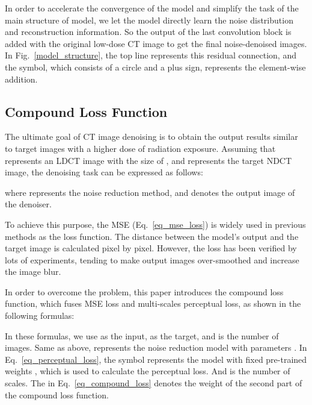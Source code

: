 \documentclass[conference]{IEEEtran}
\begin{document}
            In order to accelerate the convergence of the model and simplify the task of the main structure of model, we let the model directly learn the noise distribution and reconstruction information. 
            So the output of the last convolution block is added with the original low-dose CT image to get the final noise-denoised images.
            In Fig.~\ref{model_structure}, the top line represents this residual connection, and the symbol, which consists of a circle and a plus sign, represents the element-wise addition.

            \subsection{Compound Loss Function} \label{compound_loss_function}
                The ultimate goal of CT image denoising is to obtain the output results similar to target images with a higher dose of radiation exposure.
                Assuming that  represents an LDCT image with the size of , and  represents the target NDCT image, the denoising task can be expressed as follows:
                
                where  represents the noise reduction method, and  denotes the output image of the denoiser.

                To achieve this purpose, the MSE (Eq.~\ref{eq_mse_loss}) is widely used in previous methods as the loss function.
                The distance between the model's output and the target image is calculated pixel by pixel. 
                However, the loss has been verified by lots of experiments, tending to make output images over-smoothed and increase the image blur.

                In order to overcome the problem, this paper introduces the compound loss function, which fuses MSE loss and multi-scales perceptual loss, as shown in the following formulas: 
                
                \begin{small}
                    
                \end{small}
                
                In these formulas, we use  as the input,  as the target, and  is the number of images.
                Same as above,  represents the noise reduction model with parameters .
                In Eq.~\ref{eq_perceptual_loss}, the symbol  represents the model with fixed pre-trained weights , which is used to calculate the perceptual loss.
                And  is the number of scales. 
                The  in Eq.~\ref{eq_compound_loss} denotes the weight of the second part of the compound loss function.
\end{document}
